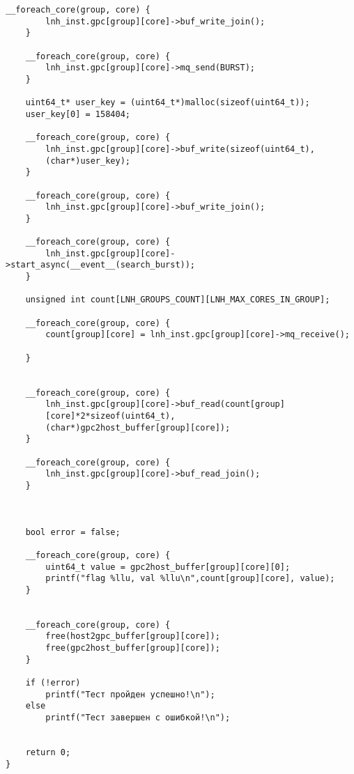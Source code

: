 \begin{lstlisting}[caption={Код программы по индивидуальному варианту host\_main.cpp}, label=lst1, style=Go ]
	__foreach_core(group, core) {
		lnh_inst.gpc[group][core]->buf_write_join();
	}

	__foreach_core(group, core) {
		lnh_inst.gpc[group][core]->mq_send(BURST);
	}
	
	uint64_t* user_key = (uint64_t*)malloc(sizeof(uint64_t));
    user_key[0] = 158404;
    
	__foreach_core(group, core) {
		lnh_inst.gpc[group][core]->buf_write(sizeof(uint64_t),
		(char*)user_key);
	}

	__foreach_core(group, core) {
		lnh_inst.gpc[group][core]->buf_write_join();
	}

	__foreach_core(group, core) {
		lnh_inst.gpc[group][core]->start_async(__event__(search_burst));
	}

	unsigned int count[LNH_GROUPS_COUNT][LNH_MAX_CORES_IN_GROUP];

	__foreach_core(group, core) {
		count[group][core] = lnh_inst.gpc[group][core]->mq_receive();
        
	}


	__foreach_core(group, core) {
		lnh_inst.gpc[group][core]->buf_read(count[group]
		[core]*2*sizeof(uint64_t),
		(char*)gpc2host_buffer[group][core]);
	}

	__foreach_core(group, core) {
		lnh_inst.gpc[group][core]->buf_read_join();
	}
	
	

	bool error = false;

	__foreach_core(group, core) {
		uint64_t value = gpc2host_buffer[group][core][0];
        printf("flag %llu, val %llu\n",count[group][core], value);
	}


	__foreach_core(group, core) {
		free(host2gpc_buffer[group][core]);
		free(gpc2host_buffer[group][core]);
	}

	if (!error)
		printf("Тест пройден успешно!\n");
	else
		printf("Тест завершен с ошибкой!\n");


	return 0;
}

\end{lstlisting}

